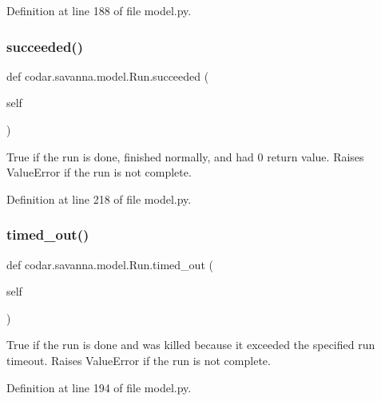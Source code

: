 Definition at line 188 of file model.\+py.

\mbox{\label{classcodar_1_1savanna_1_1model_1_1_run_a5b08f9604e4010ab32059e3291448cda}} 
\subsubsection{\texorpdfstring{succeeded()}{succeeded()}}
{\footnotesize\ttfamily def codar.\+savanna.\+model.\+Run.\+succeeded (\begin{DoxyParamCaption}\item[{}]{self }\end{DoxyParamCaption})}

\begin{DoxyVerb}True if the run is done, finished normally, and had 0 return value.
Raises ValueError if the run is not complete.\end{DoxyVerb}
 

Definition at line 218 of file model.\+py.

\mbox{\label{classcodar_1_1savanna_1_1model_1_1_run_a3d5293dbe910c5e940e71ceeeb82778d}} 
\subsubsection{\texorpdfstring{timed\+\_\+out()}{timed\_out()}}
{\footnotesize\ttfamily def codar.\+savanna.\+model.\+Run.\+timed\+\_\+out (\begin{DoxyParamCaption}\item[{}]{self }\end{DoxyParamCaption})}

\begin{DoxyVerb}True if the run is done and was killed because it exceeded the
specified run timeout. Raises ValueError if the run is not complete.\end{DoxyVerb}
 

Definition at line 194 of file model.\+py.



